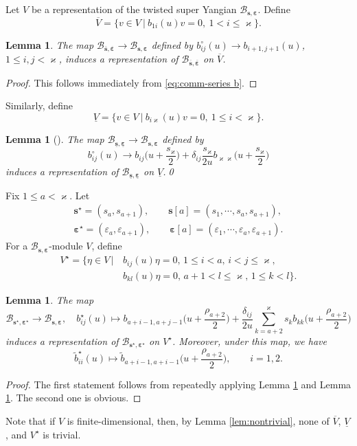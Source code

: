 \documentclass[11pt,reqno]{amsart}
\numberwithin{equation}{section}
\newtheorem{lem}[thm]{Lemma}
\theoremstyle{definition}
\theoremstyle{remark}
\newcommand{\beq}{\begin{equation}}
\newcommand{\eeq}{\end{equation}}
\newcommand{\tl}{\tilde}
\newcommand{\lle}{\leqslant}
\newcommand{\BMN}{{\mathscr{B}_{\bm s,\bm \ve}}}
\newcommand{\ka}{\varkappa}
\newcommand{\ve}{\varepsilon}
\newcommand{\s}{{\bm s}}
\newcommand{\ovs}{{\overline{\bm s}}}
\newcommand{\ove}{{\overline{\bm \varepsilon}}}
\newcommand{\uns}{{\underline{\bm s}}}
\newcommand{\une}{{\underline{\bm \varepsilon}}}
\begin{document}
Let $V$ be a representation of the twisted super Yangian $\mathscr B_{\bm s,\bm \ve}$. Define
\beq\label{Vover}
\overline V=\{v\in V~|~ b_{1i}(u)v=0,\ 1<i\lle \ka\}.
\eeq
\begin{lem}\label{lem:embedding-over}
The map $\mathscr B_{\ovs,\ove}\to \mathscr B_{\bm s,\bm \ve}$ defined by ${b}^\circ_{ij}(u)\to b_{i+1,j+1}(u)$, $1\lle i,j<\ka$, induces a representation of $\mathscr B_{\ovs,\ove}$ on $\overline V$.
\end{lem}
\begin{proof}
This follows immediately from \eqref{eq:comm-series b}.
\end{proof}

Similarly, define
\beq\label{Vund}
\underline{V}=\{v\in V~|~ b_{i\ka}(u)v=0,\ 1\lle i<\ka\}.
\eeq
\begin{lem}[{\cite[Theorem 3.1]{Belliard2009nested}}]\label{lem:embedding-under}
The map $\mathscr B_{\uns,\une}\to \mathscr B_{\bm s,\bm \ve}$ defined by
$$
b_{ij}^\circ(u)\to b_{ij}\Big(u+\frac{s_\ka}{2}\Big)+\delta_{ij}\frac{s_\ka}{2u}b_{\ka\ka}\Big(u+\frac{s_\ka}{2}\Big)
$$ induces a representation of $\mathscr B_{\uns,\une}$ on $\underline{V}$.\qed
\end{lem}

Fix $1\lle a<\ka$. Let
\begin{align*}
   \s^\star=(s_{a},s_{a+1}),\qquad \bm \s[a]=(s_1,\cdots,s_{a},s_{a+1}),\\
   \bm\ve^\star=(\ve_{a},\ve_{a+1}),\qquad \bm \ve[a]=(\ve_1,\cdots,\ve_{a},\ve_{a+1}).
\end{align*}
For a $\BMN$-module $V$, define
\beq\label{vstar}
\begin{split}
V^\star=\{\eta\in V\,|\,& b_{ij}(u)\eta=0,\, 1\lle i< a,\, i<j\lle \ka,\\
&b_{kl}(u)\eta=0,\, a+1< l \lle \ka,\, 1\lle k<l\}.
\end{split}
\eeq
\begin{lem}\label{B2reduction}
The map
\[
\mathscr B_{\s^\star,\bm\ve^\star}\to \BMN,\quad b_{ij}^\star(u)\mapsto b_{a+i-1,a+j-1}\Big(u+\frac{\rho_{a+2}}{2}\Big)+\frac{\delta_{ij}}{2u}\sum_{k=a+2}^\ka s_k b_{kk}\Big(u+\frac{\rho_{a+2}}{2}\Big)
\]
induces a representation of $\mathscr B_{\s^\star,\bm\ve^\star}$ on $V^\star$. Moreover, under this map, we have
\[
\tl b_{ii}^\star(u)\mapsto \tl b_{a+i-1,a+i-1}\Big(u+\frac{\rho_{a+2}}{2}\Big),\qquad i=1,2.
\]
\end{lem}
\begin{proof}
The first statement follows from repeatedly applying Lemma \ref{lem:embedding-over} and Lemma \ref{lem:embedding-under}. The second one is obvious.
\end{proof}
Note that if $V$ is finite-dimensional, then, by Lemma \ref{lem:nontrivial}, none of $\overline V$, $\underline V$, and $V^\star$ is trivial.
\end{document}
